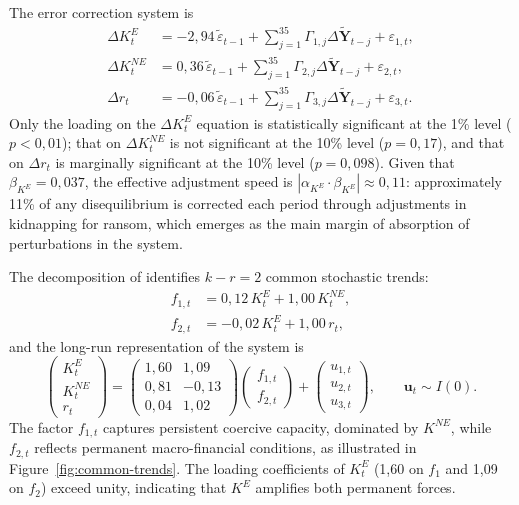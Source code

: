 \documentclass[ecta,nameyear,draft]{econsocart}
\theoremstyle{plain}
\theoremstyle{definition}
\newcommand{\1}{\mathbf{1}}
\begin{document}
The error correction system is
\begin{align}
\Delta K^E_t &= -2{,}94\,\tilde{\varepsilon}_{t-1} +
\sum_{j=1}^{35}\Gamma_{1,j}\Delta \tilde{\mathbf{Y}}_{t-j} + \varepsilon_{1,t}, \label{eq:vec1}\\
\Delta K^{NE}_t &= 0{,}36\,\tilde{\varepsilon}_{t-1} +
\sum_{j=1}^{35}\Gamma_{2,j}\Delta \tilde{\mathbf{Y}}_{t-j} + \varepsilon_{2,t}, \label{eq:vec2}\\
\Delta r_t &= -0{,}06\,\tilde{\varepsilon}_{t-1} +
\sum_{j=1}^{35}\Gamma_{3,j}\Delta \tilde{\mathbf{Y}}_{t-j} + \varepsilon_{3,t}. \label{eq:vec3}
\end{align}
Only the loading on the $\Delta K^E_t$ equation is statistically significant at the 1\% level ($p<0{,}01$); that on $\Delta K^{NE}_t$ is not significant at the 10\% level ($p=0{,}17$), and that on $\Delta r_t$ is marginally significant at the 10\% level ($p=0{,}098$). Given that $\beta_{K^E} = 0{,}037$, the effective adjustment speed is $|\alpha_{K^E} \cdot \beta_{K^E}| \approx 0{,}11$: approximately 11\% of any disequilibrium is corrected each period through adjustments in kidnapping for ransom, which emerges as the main margin of absorption of perturbations in the system.

The decomposition of \citet{GonzaloGranger1995} identifies $k - r = 2$ common stochastic trends:
\begin{align}
f_{1,t} &= 0{,}12\,K^E_t + 1{,}00\,K^{NE}_t, \label{eq:gg1}\\
f_{2,t} &= -0{,}02\,K^E_t + 1{,}00\,r_t, \label{eq:gg2}
\end{align}
and the long-run representation of the system is
\begin{equation}
\begin{pmatrix} K^E_t \\ K^{NE}_t \\ r_t \end{pmatrix}
=
\begin{pmatrix} 1{,}60 & 1{,}09 \\ 0{,}81 & -0{,}13 \\ 0{,}04 & 1{,}02 \end{pmatrix}
\begin{pmatrix} f_{1,t} \\ f_{2,t} \end{pmatrix}
+
\begin{pmatrix} u_{1,t} \\ u_{2,t} \\ u_{3,t} \end{pmatrix},
\qquad \mathbf{u}_t \sim I(0).
\label{eq:gg}
\end{equation}
The factor $f_{1,t}$ captures persistent coercive capacity, dominated by $K^{NE}$, while $f_{2,t}$ reflects permanent macro-financial conditions, as illustrated in Figure~\ref{fig:common-trends}. The loading coefficients of $K^E_t$ (1{,}60 on $f_1$ and 1{,}09 on $f_2$) exceed unity, indicating that $K^E$ amplifies both permanent forces.
\end{document}

